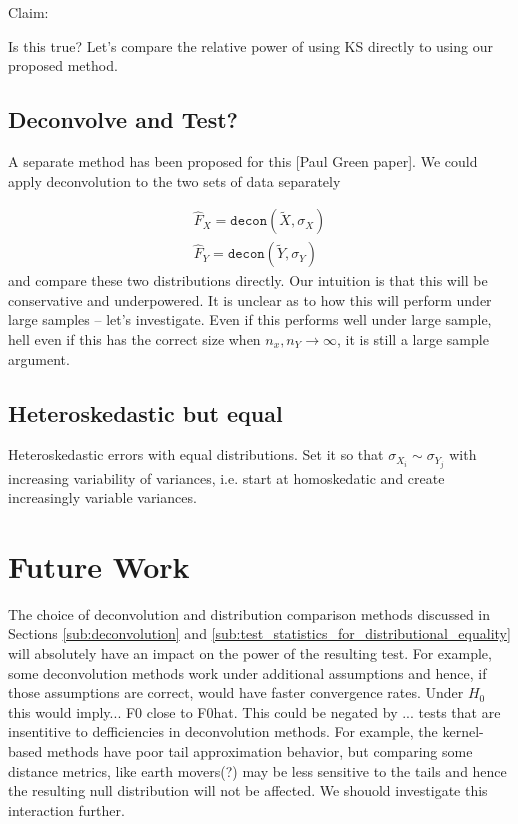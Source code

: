 \documentclass[12pt]{article}
\begin{document}
Claim:  

Is this true? Let's compare the relative power of using KS directly to using our proposed method.


\subsection{Deconvolve and Test?} %
\label{sub:deconvolve_and_test}

A separate method has been proposed for this [Paul Green paper]. We could apply deconvolution to the two sets of data separately 

\begin{align*}
	\widehat{F}_X = \texttt{decon}(\widetilde{X}, \sigma_X)\\
	\widehat{F}_Y = \texttt{decon}(\widetilde{Y}, \sigma_Y)
\end{align*}
 and compare these two distributions directly. Our intuition is that this will be conservative and underpowered. It is unclear as to how this will perform under large samples -- let's investigate. Even if this performs well under large sample, hell even if this has the correct size when $n_x, n_Y \rightarrow \infty$, it is still a large sample argument. 


\subsection{Heteroskedastic but equal} %
\label{sub:heteroskedastic_but_equal}

Heteroskedastic errors with equal distributions. Set it so that $\sigma_{X_i} \sim \sigma_{Y_j}$ with increasing variability of variances, i.e. start at homoskedatic and create increasingly variable variances. 








\section{Future Work} %
\label{sec:future_work}

The choice of deconvolution and distribution comparison methods discussed in Sections \ref{sub:deconvolution} and \ref{sub:test_statistics_for_distributional_equality} will absolutely have an impact on the power of the resulting test. For example, some deconvolution methods work under additional assumptions and hence, if those assumptions are correct, would have faster convergence rates. Under $H_0$ this would imply... F0 close to F0hat. This could be negated by ... tests that are insentitive to defficiencies in deconvolution methods. For example, the kernel-based methods have poor tail approximation behavior, but comparing some distance metrics, like earth movers(?) may be less sensitive to the tails and hence the resulting null distribution will not be affected. We shouold investigate this interaction further. 






\end{document}
